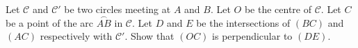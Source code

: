 Let $\mathcal{C}$ and $\mathcal{C}'$ be two circles meeting at $A$ and $B$. Let $O$ be the centre of $\mathcal{C}$. Let $C$ be a point of the arc $\overset{\frown}{AB}$ in $\mathcal{C}$. Let $D$ and $E$ be the intersections of $(BC)$ and $(AC)$ respectively with $\mathcal{C}'$. Show that $(OC)$ is perpendicular to $(DE)$.
